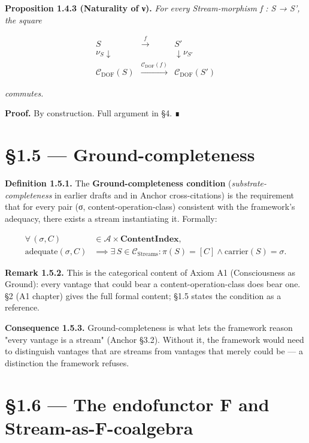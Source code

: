 \documentclass[11pt, openany]{book}
\newcommand{\sectionbreak}{\clearpage}
\begin{document}
\textbf{Proposition 1.4.3 (Naturality of ν).} \textit{For every Stream-morphism f : S → S', the square}

\[
\begin{array}{ccc}
S & \xrightarrow{f} & S' \\
{\scriptstyle \nu_S} \downarrow & & \downarrow {\scriptstyle \nu_{S'}} \\
\mathcal{C}_\mathrm{DOF}(S) & \xrightarrow{\mathcal{C}_\mathrm{DOF}(f)} & \mathcal{C}_\mathrm{DOF}(S')
\end{array}
\]

\textit{commutes.}

\textbf{Proof.} By construction. Full argument in §4. ∎

\sectionbreak

\section{§1.5 --- Ground-completeness}

\textbf{Definition 1.5.1.} The \textbf{Ground-completeness condition} (\textit{substrate-completeness} in earlier drafts and in Anchor cross-citations) is the requirement that for every pair (σ, content-operation-class) consistent with the framework's adequacy, there exists a stream instantiating it. Formally:

\[
\begin{aligned}
\forall\, (σ, C) & \in \mathcal{A} \times \mathbf{ContentIndex}, \\
\mathrm{adequate}(σ, C) & \implies \exists\, S \in \mathcal{C}_\mathrm{Streams} : \pi(S) = [C] \wedge \mathrm{carrier}(S) = σ.
\end{aligned}
\]

\textbf{Remark 1.5.2.} This is the categorical content of Axiom A1 (Consciousness as Ground): every vantage that could bear a content-operation-class does bear one. §2 (A1 chapter) gives the full formal content; §1.5 states the condition as a reference.

\textbf{Consequence 1.5.3.} Ground-completeness is what lets the framework reason "every vantage is a stream" (Anchor §3.2). Without it, the framework would need to distinguish vantages that are streams from vantages that merely could be --- a distinction the framework refuses.

\sectionbreak

\section{§1.6 --- The endofunctor F and Stream-as-F-coalgebra}
\end{document}
